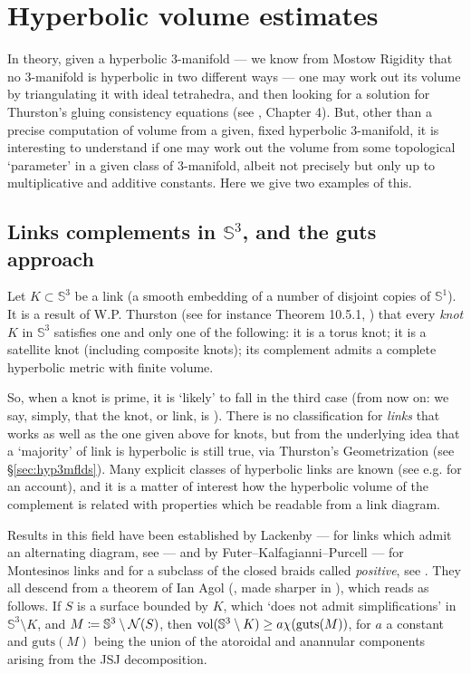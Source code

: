 \section{Hyperbolic volume estimates}\label{sec:hypvolumehistoric}

In theory, given a hyperbolic 3-manifold --- we know from Mostow Rigidity that no 3-manifold is hyperbolic in two different ways --- one may work out its volume by triangulating it with ideal tetrahedra, and then looking for a solution for Thurston's gluing consistency equations (see \cite{thurstonnotes}, Chapter 4). But, other than a precise computation of volume from a given, fixed hyperbolic 3-manifold, it is interesting to understand if one may work out the volume from some topological `parameter' in a given class of 3-manifold, albeit not precisely but only up to multiplicative and additive constants. Here we give two examples of this.

\subsection{Links complements in $\mathbb S^3$, and the guts approach}

Let $K\subset \mathbb S^3$ be a link (a smooth embedding of a number of disjoint copies of $\mathbb S^1$). It is a result of W.P. Thurston (see for instance Theorem 10.5.1, \cite{kawauchi}) that every \emph{knot} $K$ in $\mathbb S^3$ satisfies one and only one of the following: it is a torus knot; it is a satellite knot (including composite knots); its complement admits a complete hyperbolic metric with finite volume.

So, when a knot is prime, it is `likely' to fall in the third case (from now on: we say, simply, that the knot, or link, is ). There is no classification for \emph{links} that works as well as the one given above for knots, but from the underlying idea that a `majority' of link is hyperbolic is still true, via Thurston's Geometrization (see \S\ref{sec:hyp3mflds}). Many explicit classes of hyperbolic links are known (see e.g. \cite{adams} for an account), and it is a matter of interest how the hyperbolic volume of the complement is related with properties which be readable from a link diagram.

Results in this field have been established by Lackenby --- for links which admit an alternating diagram, see \cite{lackenby} --- and by Futer--Kalfagianni--Purcell --- for Montesinos links and for a subclass of the closed braids called \emph{positive}, see \cite{futerkalfapurcell}. They all descend from a theorem of Ian Agol (\cite{agol}, made sharper in \cite{agolimproved}), which reads as follows. If $S$ is a surface bounded by $K$, which `does not admit simplifications' in $\mathbb S^3\setminus K$, and $M\coloneqq \mathbb S^3\setminus {\mathcal N}(S)$, then $\mathrm{vol}(\mathbb S^3\setminus K)\geq a\chi(\mathrm{guts}(M))$, for $a$ a constant and $\mathrm{guts}(M)$ being the union of the atoroidal and anannular components arising from the JSJ decomposition.

